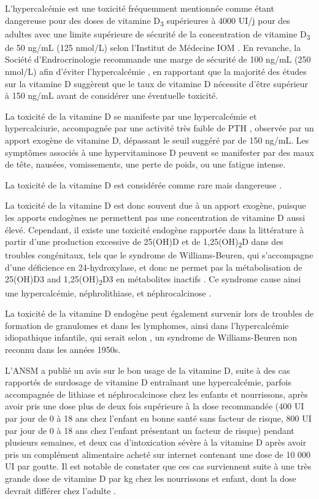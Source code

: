 \documentclass[
  a4paper,
  DIV=11,
  numbers=noendperiod,
  listof=totoc]{scrreprt}
\begin{document}
L'hypercalcémie est une toxicité fréquemment mentionnée comme étant
dangereuse pour des doses de vitamine D\textsubscript{3} supérieures à
4000 UI/j pour des adultes avec une limite supérieure de sécurité de la
concentration de vitamine D\textsubscript{3} de 50 ng/mL (125 nmol/L)
selon l'Institut de Médecine \acs{IOM} \autocites[
]{IOM.2011.org}{Holick.2011}. En revanche, la Société d'Endrocrinologie
recommande une marge de sécurité de 100 ng/mL (250 nmol/L) afin d'éviter
l'hypercalcémie \autocite{Holick.2011}, en rapportant que la majorité
des études sur la vitamine D suggèrent que le taux de vitamine D
nécessite d'être supérieur à 150 ng/mL avant de considérer une
éventuelle toxicité.

La toxicité de la vitamine D se manifeste par une hypercalcémie et
hypercalciurie, accompagnée par une activité très faible de PTH
\autocite{Marcinowska-Suchowierska.2018}, observée par un apport exogène
de vitamine D, dépassant le seuil suggéré par \textcite{Holick.2011} de
150 ng/mL. Les symptômes associés à une hypervitaminose D peuvent se
manifester par des maux de tête, nausées, vomissements, une perte de
poids, ou une fatigue intense.

La toxicité de la vitamine D est considérée comme rare mais dangereuse
\autocite{Marcinowska-Suchowierska.2018,Holick.2015}.

La toxicité de la vitamine D est donc souvent due à un apport exogène,
puisque les apports endogènes ne permettent pas une concentration de
vitamine D aussi élevé. Cependant, il existe une toxicité endogène
rapportée dans la littérature à partir d'une production excessive de
25(OH)D et de 1,25(OH)\textsubscript{2}D dans des troubles congénitaux,
tels que le syndrome de Williams-Beuren, qui s'accompagne d'une
déficience en 24-hydroxylase, et donc ne permet pas la métabolisation de
25(OH)D3 and 1,25(OH)\textsubscript{2}D3 en métabolites inactifs
\autocite{Marcinowska-Suchowierska.2018,Holick.2015}. Ce syndrome cause
ainsi une hypercalcémie, néphrolithiase, et néphrocalcinose
\autocite{Azer.2021}.

La toxicité de la vitamine D endogène peut également survenir lors de
troubles de formation de granulomes et dans les lymphomes, ainsi dans
l'hypercalcémie idiopathique infantile, qui serait selon
\textcite{Holick.2015}, un syndrome de Williams-Beuren non reconnu dans
les années 1950s.

L'ANSM a publié un avis sur le bon usage de la vitamine D, suite à des
cas rapportés de surdosage de vitamine D entraînant une hypercalcémie,
parfois accompagnée de lithiase et néphrocalcinose chez les enfants et
nourrissons, après avoir pris une dose plus de deux fois supérieure à la
dose recommandée (400 UI par jour de 0 à 18 ans chez l'enfant en bonne
santé sans facteur de risque, 800 UI par jour de 0 à 18 ans chez
l'enfant présentant un facteur de risque) pendant plusieurs semaines, et
deux cas d'intoxication sévère à la vitamine D après avoir pris un
complément alimentaire acheté sur internet contenant une dose de 10 000
UI par goutte. Il est notable de constater que ces cas surviennent suite
à une très grande dose de vitamine D par kg chez les nourrissons et
enfant, dont la dose devrait différer chez l'adulte
\autocite{ANSM.2021}.
\end{document}

